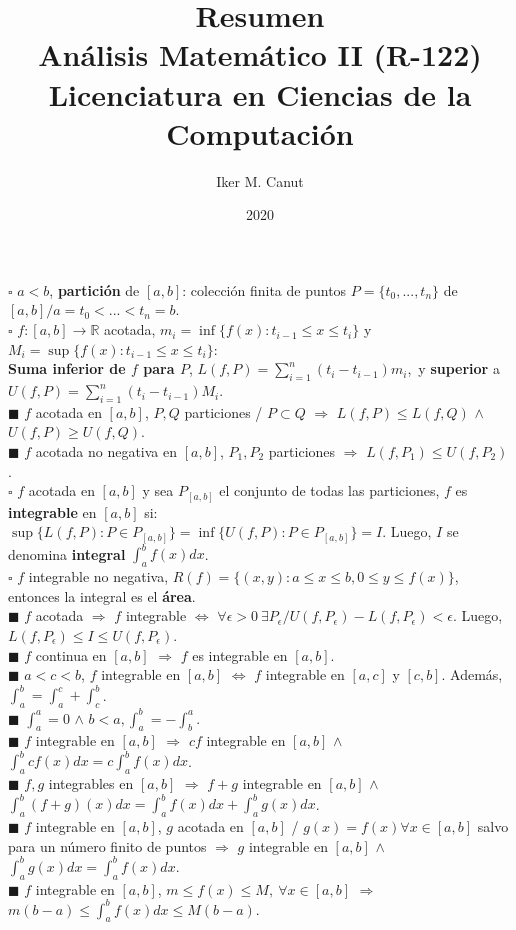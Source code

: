 \documentclass[11pt,a4paper]{article}
\author{Iker M. Canut}
\title{Resumen\\ An\'alisis Matem\'atico II (R-122)\\Licenciatura en Ciencias de la Computaci\'on}
\date{2020}
\begin{document}
\maketitle
\newpage

$\square$ $a<b$, \textbf{partici\'on} de $[a,b]$: colecci\'on finita de puntos $P = \{ t_0, ..., t_n \}$ de $[a,b] / a = t_0 < ... < t_n = b$.\\
$\square$ $f : [a,b] \rightarrow \mathbb{R}$ acotada, $m_i = \inf\{f(x) : t_{i-1} \leq x \leq t_i\}$ y $M_i = \sup\{f(x) : t_{i-1} \leq x \leq t_i\}$:\\
\textbf{Suma inferior de $f$ para $P$}, $L(f, P) = \sum_{i=1}^n (t_i - t_{i-1})m_i$,\ y \textbf{superior} a $U(f, P) = \sum_{i=1}^n (t_i - t_{i-1})M_i$.\\
$\blacksquare$ $f$ acotada en $[a,b]$, $P,Q$ particiones / $P \subset Q$ $\Rightarrow$ $L(f,P) \leq L(f,Q)$ $\land$ $U(f, P) \geq U(f,Q)$.\\
$\blacksquare$ $f$ acotada no negativa en $[a,b]$, $P_1, P_2$ particiones $\Rightarrow$ $L(f, P_1) \leq U(f, P_2)$.\\
$\square$ $f$ acotada en $[a,b]$ y sea $P_{[a,b]}$ el conjunto de todas las particiones, $f$ es \textbf{integrable} en $[a,b]$ si: \\ $\sup\{L(f,P) : P \in P_{[a,b]}\} = \inf\{U(f,P) : P \in P_{[a,b]}\} = I$. Luego, $I$ se denomina \textbf{integral} $\int_a^b f(x)dx$.\\
$\square$ $f$ integrable no negativa, $R(f) = \{(x,y) : a \leq x \leq b, 0 \leq y \leq f(x)\}$, entonces la integral es el \textbf{\'area}.\\
$\blacksquare$ $f$ acotada $\Rightarrow$ $f$ integrable $\iff$ $\forall \epsilon > 0\ \exists P_\epsilon / U(f, P_\epsilon) - L(f,P_\epsilon) < \epsilon$. Luego, $L(f,P_\epsilon) \leq I \leq U(f, P_\epsilon)$.\\
$\blacksquare$ $f$ continua en $[a,b]$ $\Rightarrow$ $f$ es integrable en $[a,b]$.\\
$\blacksquare$ $a<c<b$, $f$ integrable en $[a,b]$ $\iff$ $f$ integrable en $[a,c]$ y $[c,b]$. Adem\'as, $\int_a^b = \int_a^c + \int_c^b$.\\
$\blacksquare$ $\int_a^a = 0$ $\land$ $b<a, \int_a^b = - \int_b^a$.\\
$\blacksquare$ $f$ integrable en $[a,b]$ $\Rightarrow$ $cf$ integrable en $[a,b]$ $\land$ $\int_a^bcf(x)dx = c\int_a^bf(x)dx$.\\
$\blacksquare$ $f,g$ integrables en $[a,b]$ $\Rightarrow$ $f+g$ integrable en $[a,b]$ $\land$ $\int_a^b (f+g)(x) dx = \int_a^bf(x) dx + \int_a^bg(x)dx$.\\
$\blacksquare$ $f$ integrable en $[a,b]$, $g$ acotada en $[a,b]$ / $g(x) = f(x) \forall x \in [a,b]$ salvo para un n\'umero finito de puntos $\Rightarrow$ $g$ integrable en $[a,b]$ $\land$ $\int_a^bg(x)dx = \int_a^bf(x)dx$.\\
$\blacksquare$ $f$ integrable en $[a,b]$, $m \leq f(x) \leq M, \ \forall x \in [a,b]$ $\Rightarrow$ $m(b-a) \leq \int_a^bf(x)dx \leq M(b-a)$.\\
\end{document}
